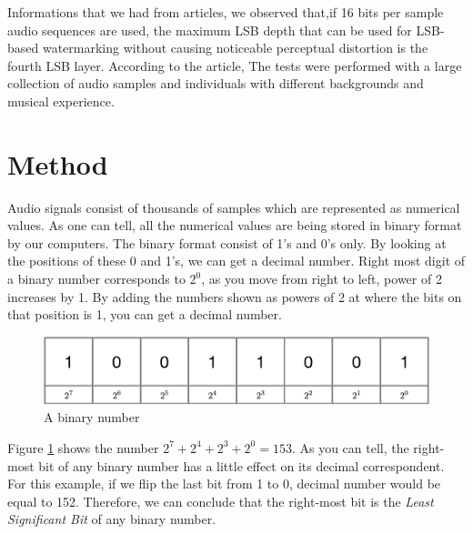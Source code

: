 \documentclass[twocolumns]{IEEEtran}
\begin{document}
	
	Informations that we had from articles, we observed that,if
	16 bits per sample audio sequences are used,  the maximum LSB depth that
	can be used for LSB-based watermarking without causing
	noticeable perceptual distortion is the fourth LSB layer. According to the article, The tests
	were performed with a large collection of audio samples
	and individuals with different backgrounds and musical
	experience.
	
	\section{Method}
	Audio signals consist of thousands of samples which are represented as numerical values. As one can tell, all the numerical values are being stored in binary format by our computers. The binary format consist of 1's and 0's only. By looking at the positions of these 0 and 1's, we can get a decimal number. Right most digit of a binary number corresponds to $2^0$, as you move from right to left, power of 2 increases by 1. By adding the numbers shown as powers of 2 at where the bits on that position is 1, you can get a decimal number.
	\begin{figure}[h]
		\centering
		\includegraphics[scale=.5]{binary_num.eps}
		\caption{A binary number}
		\label{fig:binary}
	\end{figure}

	Figure \ref{fig:binary} shows the number $2^7 + 2^4 + 2^3 + 2^0 = 153$. As you can tell, the right-most bit of any binary number has a little effect on its decimal correspondent. For this example, if we flip the last bit from 1 to 0, decimal number would be equal to 152. Therefore, we can conclude that the right-most bit is the \textit{Least Significant Bit} of any binary number.
	
\end{document}
